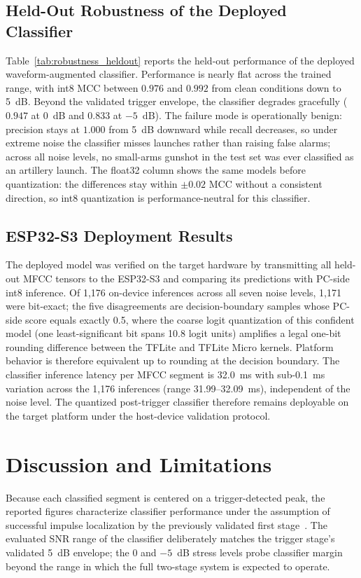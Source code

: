 ﻿\documentclass[conference]{IEEEtran}
\begin{document}


\subsection{Held-Out Robustness of the Deployed Classifier}
Table~\ref{tab:robustness_heldout} reports the held-out performance of the deployed waveform-augmented classifier. Performance is nearly flat across the trained range, with int8 MCC between $0.976$ and $0.992$ from clean conditions down to 5~dB. Beyond the validated trigger envelope, the classifier degrades gracefully ($0.947$ at 0~dB and $0.833$ at $-5$~dB). The failure mode is operationally benign: precision stays at $1.000$ from 5~dB downward while recall decreases, so under extreme noise the classifier misses launches rather than raising false alarms; across all noise levels, no small-arms gunshot in the test set was ever classified as an artillery launch. The float32 column shows the same models before quantization: the differences stay within $\pm 0.02$ MCC without a consistent direction, so int8 quantization is performance-neutral for this classifier.



\subsection{ESP32-S3 Deployment Results}
The deployed model was verified on the target hardware by transmitting all held-out MFCC tensors to the ESP32-S3 and comparing its predictions with PC-side int8 inference. Of 1,176 on-device inferences across all seven noise levels, 1,171 were bit-exact; the five disagreements are decision-boundary samples whose PC-side score equals exactly 0.5, where the coarse logit quantization of this confident model (one least-significant bit spans 10.8 logit units) amplifies a legal one-bit rounding difference between the TFLite and TFLite Micro kernels. Platform behavior is therefore equivalent up to rounding at the decision boundary. The classifier inference latency per MFCC segment is 32.0~ms with sub-0.1~ms variation across the 1,176 inferences (range 31.99--32.09~ms), independent of the noise level. The quantized post-trigger classifier therefore remains deployable on the target platform under the host-device validation protocol.

\section{Discussion and Limitations}
Because each classified segment is centered on a trigger-detected peak, the reported figures characterize classifier performance under the assumption of successful impulse localization by the previously validated first stage~\cite{svatos2019smart_acoustic_sensor}. The evaluated SNR range of the classifier deliberately matches the trigger stage's validated 5~dB envelope; the 0 and $-5$~dB stress levels probe classifier margin beyond the range in which the full two-stage system is expected to operate.
\end{document}
